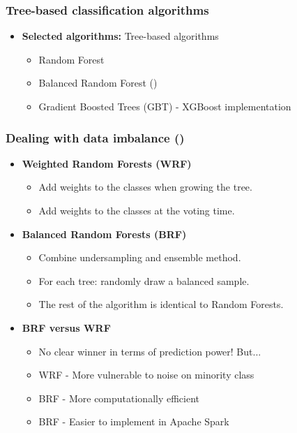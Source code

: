 \documentclass[slidestop,compress,red,mathserif]{beamer}
\newcommand{\colorcite}[1]{\colorlet{saved}{.}\color{sangria}\cite{#1}\color{saved}}
\begin{document}
\begin{frame}
\frametitle{Tree-based classification algorithms}
\begin{itemize}
\vfill
\item[] \textbf{Selected algorithms:} Tree-based algorithms
  \begin{itemize}
  	\item Random Forest
    \item Balanced Random Forest (\colorcite{Chen2004})
    \item Gradient Boosted Trees (GBT) - XGBoost implementation
  \end{itemize}
\vfill
\end{itemize}
\end{frame}


\begin{frame}
\frametitle{Dealing with data imbalance (\cite{Chen2004})}
\begin{itemize}
  \item[] \textbf{Weighted Random Forests (WRF)}
    \begin{itemize}
      \item Add weights to the classes when growing the tree.
      \item Add weights to the classes at the voting time.
    \end{itemize}

  \item[] \textbf{Balanced Random Forests (BRF)}
    \begin{itemize}
      \item Combine undersampling and ensemble method.
      \item For each tree: randomly draw a balanced sample.
      \item The rest of the algorithm is identical to Random Forests.
    \end{itemize}

  \item[] \textbf{BRF versus WRF}
    \begin{itemize}
      \item No clear winner in terms of prediction power! But...
      \item WRF - More vulnerable to noise on minority class
      \item BRF - More computationally efficient
      \item BRF - Easier to implement in Apache Spark
    \end{itemize}
\end{itemize}
\end{frame}
\end{document}
